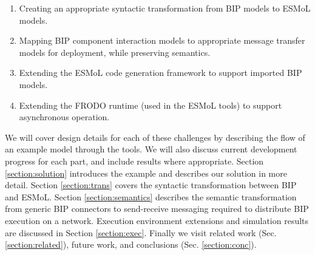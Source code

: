 \begin{enumerate}
 \item Creating an appropriate syntactic transformation from BIP models to ESMoL models.
 \item Mapping BIP component interaction models to appropriate message transfer models
for deployment, while preserving semantics.
 \item Extending the ESMoL code generation framework to support imported BIP models.
 \item Extending the FRODO runtime (used in the ESMoL tools) to support asynchronous
operation.
\end{enumerate}

We will cover design details for each of these challenges by describing the 
flow of an example model through the tools.  We will also discuss current development 
progress for each part, and include results where appropriate.  Section \ref{section:solution}
introduces the example and describes our solution in more detail.  Section \ref{section:trans} 
covers the syntactic transformation between BIP and ESMoL.  Section \ref{section:semantics}
describes the semantic transformation from generic BIP connectors to send-receive messaging
required to distribute BIP execution on a network.  Execution environment extensions and 
simulation results are discussed in Section \ref{section:exec}.  Finally we visit
related work (Sec. \ref{section:related}), future work, and conclusions (Sec. \ref{section:conc}).